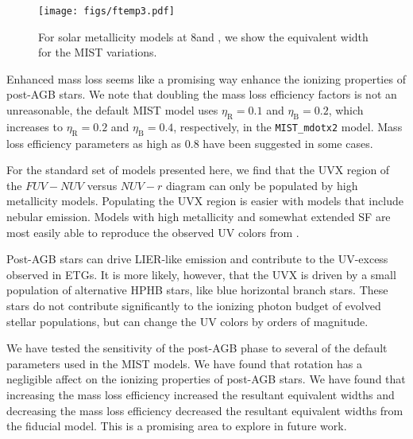 \begin{figure}
  \begin{center}
    \texttt{[image: figs/ftemp3.pdf]}
    \caption{For solar metallicity models at 8\Gyr and , we show the \ha equivalent width for the MIST variations.}
    \label{fig:EWvar}
  \end{center}
\end{figure}
Enhanced mass loss seems like a promising way enhance the ionizing properties of post-AGB stars. We note that doubling the mass loss efficiency factors is not an unreasonable, the default MIST model uses $\eta_{\mathrm{R}} = 0.1$ and $\eta_{\mathrm{B}} = 0.2$, which increases to $\eta_{\mathrm{R}} = 0.2$ and $\eta_{\mathrm{B}} = 0.4$, respectively, in the {\tt MIST\_mdotx2} model. Mass loss efficiency parameters as high as 0.8 have been suggested in some cases. %


\item For the standard set of models presented here, we find that the UVX region of the $FUV-NUV$ versus $NUV-r$ diagram can only be populated by high metallicity models. Populating the UVX region is easier with models that include nebular emission. Models with high metallicity and somewhat extended SF are most easily able to reproduce the observed UV colors from \citet{Hernandez+2014}.

\item Post-AGB stars can drive LIER-like emission and contribute to the UV-excess observed in ETGs. It is more likely, however, that the UVX is driven by a small population of alternative HPHB stars, like blue horizontal branch stars. These stars do not contribute significantly to the ionizing photon budget of evolved stellar populations, but can change the UV colors by orders of magnitude.

\item We have tested the sensitivity of the post-AGB phase to several of the default parameters used in the MIST models. We have found that rotation has a negligible affect on the ionizing properties of post-AGB stars. We have found that increasing the mass loss efficiency increased the resultant \ha equivalent widths and decreasing the mass loss efficiency decreased the resultant \ha equivalent widths from the fiducial model. This is a promising area to explore in future work. 




